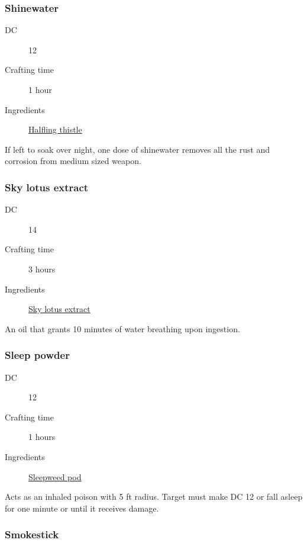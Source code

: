 \subsubsection{Shinewater}
\label{Shinewater}

\begin{description}
\item [DC] 12 \nature
\item [Crafting time] 1 hour
\item [Ingredients] \hyperref[Halfling Thistle]{Halfling thistle}
\end{description}

If left to soak over night, one dose of shinewater removes all the rust and corrosion 
from medium sized weapon.

\subsubsection{Sky lotus extract}
\label{Sky lotus extract}

\begin{description}
\item [DC] 14 \survival
\item [Crafting time] 3 hours
\item [Ingredients] \hyperref[Sky lotus]{Sky lotus extract}
\end{description}

An oil that grants 10 minutes of water breathing upon ingestion.

\subsubsection{Sleep powder}
\label{Sleep powder}

\begin{description}
\item [DC] 12 \nature
\item [Crafting time] 1 hours
\item [Ingredients] \hyperref[Sleepweed]{Sleepweed pod}
\end{description}

Acts as an inhaled poison with 5 ft radius. Target must make DC 12 \constitutionsave or 
fall asleep for one minute or until it receives damage.

\subsubsection{Smokestick}
\label{Smokestick}

